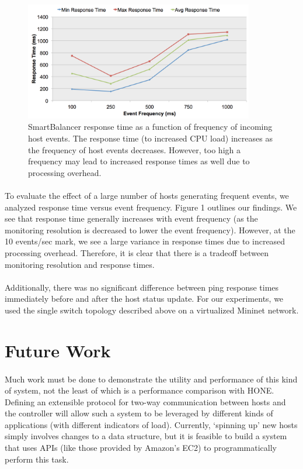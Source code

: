 \documentclass[10pt]{article}
\begin{document}
\begin{figure}[ht!]
\centering
\includegraphics[width=100mm]{responseTime.png}
\caption{SmartBalancer response time as a function of frequency of incoming host events. The response time (to increased CPU load) increases as the frequency of host events decreases. However, too high a frequency may lead to increased response times as well due to processing overhead.}
\label{pic:responseTime}
\end{figure}
\paragraph{} To evaluate the effect of a large number of hosts generating frequent events, we analyzed response time versus event frequency. Figure 1 outlines our findings. We see that response time generally increases with event frequency (as the monitoring resolution is decreased to lower the event frequency). However, at the 10 events/sec mark, we see a large variance in response times due to increased processing overhead. Therefore, it is clear that there is a tradeoff between monitoring resolution and response times.

\paragraph{} Additionally, there was no significant difference between ping response times immediately before and after the host status update. For our experiments, we used the single switch topology described above on a virtualized Mininet network.

\section{Future Work}
\label{sec:future}

\paragraph{} Much work must be done to demonstrate the utility and performance of this kind of system, not the least of which is a performance comparison with HONE\cite{HONE}. Defining an extensible protocol for two-way communication between hosts and the controller will allow such a system to be leveraged by different kinds of applications (with different indicators of load). Currently, ‘spinning up’ new hosts simply involves changes to a data structure, but it is feasible to build a system that uses APIs (like those provided by Amazon’s EC2) to programmatically perform this task.
\end{document}
